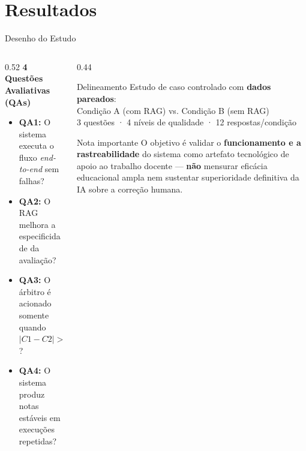 \documentclass[10pt,aspectratio=169]{beamer}
\begin{document}
\section{Resultados}

\begin{frame}{Desenho do Estudo}
  \begin{columns}[T]
    \begin{column}{0.52\textwidth}
      \textbf{4 Questões Avaliativas (QAs)}
      \begin{itemize}
        \item \textbf{QA1:} O sistema executa o fluxo \textit{end-to-end} sem falhas?
        \item \textbf{QA2:} O RAG melhora a especificidade da avaliação?
        \item \textbf{QA3:} O árbitro é acionado somente quando $|C1 - C2| > 2{,}0$?
        \item \textbf{QA4:} O sistema produz notas estáveis em execuções repetidas?
      \end{itemize}
    \end{column}
    \begin{column}{0.44\textwidth}
      \begin{block}{Delineamento}
        Estudo de caso controlado com \textbf{dados pareados}:\\
        Condição A (com RAG) vs. Condição B (sem RAG)\\[0.4em]
        3 questões · 4 níveis de qualidade · 12 respostas/condição
      \end{block}
      \vspace{0.4em}
      \begin{block}{Nota importante}
        \small O objetivo é validar o \textbf{funcionamento e a rastreabilidade} do sistema como artefato tecnológico de apoio ao trabalho docente --- \textbf{não} mensurar eficácia educacional ampla nem sustentar superioridade definitiva da IA sobre a correção humana.
      \end{block}
    \end{column}
  \end{columns}
\end{frame}
\end{document}
